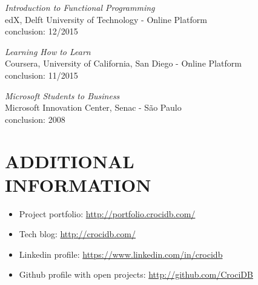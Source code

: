\documentclass[line,margin]{res}
\begin{document}
\begin{resume}
		   {\sl Introduction to Functional Programming} \\
			edX, Delft University of Technology - Online Platform \\
			conclusion: 12/2015

		   {\sl Learning How to Learn} \\
			Coursera, University of California, San Diego - Online Platform\\
			conclusion: 11/2015
		
           {\sl Microsoft Students to Business} \\
                Microsoft Innovation Center, Senac - São Paulo \\
                conclusion: 2008 

\section{ADDITIONAL \\ INFORMATION}
            \begin{itemize}  \itemsep 1pt
	    	\item Project portfolio: \href{http://portfolio.crocidb.com/}{http://portfolio.crocidb.com/}
	    	\item Tech blog: \href{http://crocidb.com/}{http://crocidb.com/}
            \item Linkedin profile: \href{https://www.linkedin.com/in/crocidb}{https://www.linkedin.com/in/crocidb}
            \item Github profile with open projects: \href{http://github.com/CrociDB}{http://github.com/CrociDB}
            \end{itemize} 

\end{resume}
\end{document}
